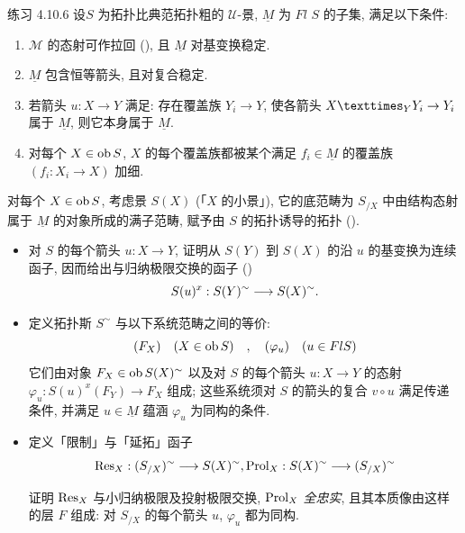 \begin{enonce*}[remark]{练习 4.10.6}
设\pageoriginale $S$ 为拓扑比典范拓扑粗的 $𝒰$-景, $\underline{M}$ 为 $Fl$ $S$ 的子集, 满足以下条件:
\begin{enumerate}
\renewcommand{\theenumi}{\alph{enumi}}
\renewcommand{\labelenumi}{\theenumi)}
\item $ℳ$ 的态射可作拉回 (), 且 $\underline{M}$ 对基变换稳定.

\item $\underline{M}$ 包含恒等箭头, 且对复合稳定.

\item 若箭头 $u:X\rightarrow Y$ 满足: 存在覆盖族 $Y_i\rightarrow Y$, 使各箭头 $\fprod{X}{Y_i}{Y}\rightarrow Y_i$ 属于 $\underline{M}$, 则它本身属于 $\underline{M}$.

\item 对每个 $X\in \operatorname{ob} S$, $X$ 的每个覆盖族都被某个满足 $f_i\in \underline{M}$ 的覆盖族 $(f_i:X_i\rightarrow X)$ 加细.
\end{enumerate}

对每个 $X\in \operatorname{ob} S$, 考虑景 $S(X)$ (「$X$ 的小景」), 它的底范畴为 $S_{/X}$ 中由结构态射属于 $\underline{M}$ 的对象所成的满子范畴, 赋予由 $S$ 的拓扑诱导的拓扑 ().
\begin{itemize}
\item[$1^{\circ})$] 对 $S$ 的每个箭头 $u:X\rightarrow Y$, 证明从 $S(Y)$ 到 $S(X)$ 的沿 $u$ 的基变换为连续函子, 因而给出与归纳极限交换的函子 ()
$$
S(u)^x:S(Y)^{\sim}\longrightarrow S(X)^{\sim}{}.
$$

\item[$2^{\circ})$] 定义拓扑斯 $S^{\sim}$ 与以下系统范畴之间的等价:
$$
(F_X)\quad (X\in \operatorname{ob} S)\quad,\quad (\varphi_u)\quad (u\in Fl S)
$$
它们\pageoriginale 由对象 $F_X\in \operatorname{ob} S(X)^{\sim}$ 以及对 $S$ 的每个箭头 $u:X\rightarrow Y$ 的态射 $\varphi_u:S(u)^x(F_Y)\rightarrow F_X$ 组成; 这些系统须对 $S$ 的箭头的复合 $v\circ u$ 满足传递条件, 并满足 $u\in \underline{M}$ 蕴涵 $\varphi_u$ 为同构的条件.

\item[$3^{\circ})$] 定义「限制」与「延拓」函子
$$
\operatorname{Res}_X:(S_{/X})^{\sim}\longrightarrow S(X)^{\sim},
\operatorname{Prol}_X:S(X)^{\sim}\longrightarrow (S_{/X})^{\sim}
$$

证明 $\operatorname{Res}_X$ 与小归纳极限及投射极限交换, $\operatorname{Prol}_X$ \emph{全忠实}, 且其本质像由这样的层 $F$ 组成: 对 $S_{/X}$ 的每个箭头 $u$, $\varphi_u$ 都为同构.


\end{itemize}
\end{enonce*}
